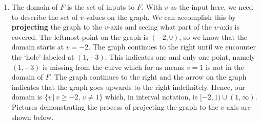 \documentclass{ximera}
\begin{document}
\begin{example}
\begin{enumerate}
\begin{enumerate}


 

\item  The domain of $F$ is the set of inputs to $F$.  With $v$ as the input here,  we need to describe the set of $v$-values on the graph.  We can accomplish this by  \textbf{projecting} the graph to the $v$-axis and seeing what part of the $v$-axis is covered. The leftmost point on the graph is $(-2,0)$, so we know that the domain starts at $v=-2$.  The graph continues to the right until we encounter the `hole' labeled at $(1,-3)$.  This indicates one and only one point, namely $(1,-3)$ is missing from the curve which for us means $v = 1$ is not in the domain of $F$.  The graph continues to the right and the arrow on the graph indicates that the graph goes upwards to the right indefinitely.  Hence, our domain is $\{ v \, | \, v \geq -2, \, v \neq 1 \}$ which, in interval notation, is $[-2, 1) \cup (1, \infty)$. Pictures demonstrating the process of projecting the graph to the $v$-axis are shown below.

 




\end{enumerate}
\end{enumerate}
\end{example}
\end{document}
